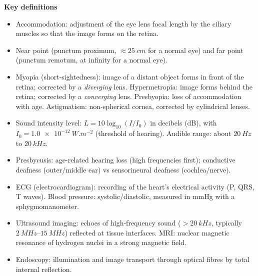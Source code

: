 \documentclass[11pt]{article}
\newcommand{\cle}[1]{{\popxbold\color{popdark}#1}}
\begin{document}
\begin{bilan}
\textbf{Key definitions}
\begin{itemize}
\item \cle{Accommodation}: adjustment of the eye lens focal length by the ciliary muscles so that the image forms on the retina.
\item \cle{Near point} (punctum proximum, $\approx \SI{25}{cm}$ for a normal eye) and \cle{far point} (punctum remotum, at infinity for a normal eye).
\item \cle{Myopia} (short-sightedness): image of a distant object forms in front of the retina; corrected by a \emph{diverging} lens. \cle{Hypermetropia}: image forms behind the retina; corrected by a \emph{converging} lens. \cle{Presbyopia}: loss of accommodation with age. \cle{Astigmatism}: non-spherical cornea, corrected by cylindrical lenses.
\item \cle{Sound intensity level}: $L = 10\log_{10}(I/I_0)$ in decibels (dB), with $I_0 = \SI{1.0e-12}{W.m^{-2}}$ (threshold of hearing). Audible range: about $\SI{20}{Hz}$ to $\SI{20}{kHz}$.
\item \cle{Presbycusis}: age-related hearing loss (high frequencies first); \cle{conductive} deafness (outer/middle ear) vs \cle{sensorineural} deafness (cochlea/nerve).
\item \cle{ECG} (electrocardiogram): recording of the heart's electrical activity (P, QRS, T waves). \cle{Blood pressure}: systolic/diastolic, measured in mmHg with a sphygmomanometer.
\item \cle{Ultrasound imaging}: echoes of high-frequency sound ($>\SI{20}{kHz}$, typically $\SI{2}{MHz}$--$\SI{15}{MHz}$) reflected at tissue interfaces. \cle{MRI}: nuclear magnetic resonance of hydrogen nuclei in a strong magnetic field.
\item \cle{Endoscopy}: illumination and image transport through optical fibres by \cle{total internal reflection}.
\end{itemize}


\end{bilan}
\end{document}
